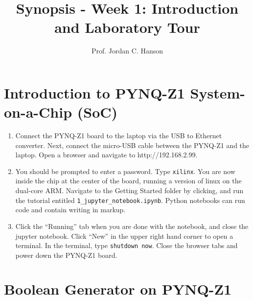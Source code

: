 \documentclass{article}
\begin{document}
\title{Synopsis - Week 1: Introduction and Laboratory Tour}
\author{Prof. Jordan C. Hanson}

\maketitle

\section{Introduction to PYNQ-Z1 System-on-a-Chip (SoC)}

\begin{enumerate}
\item Connect the PYNQ-Z1 board to the laptop via the USB to Ethernet converter.  Next, connect the micro-USB cable between the PYNQ-Z1 and the laptop.  Open a browser and navigate to http://192.168.2.99.
\item You should be prompted to enter a password.  Type \verb+xilinx+.  You are now inside the chip at the center of the board, running a version of linux on the dual-core ARM.  Navigate to the Getting Started folder by clicking, and run the tutorial entitled \verb+1_jupyter_notebook.ipynb+.  Python notebooks can run code and contain writing in markup.
\item Click the ``Running'' tab when you are done with the notebook, and close the jupyter notebook.  Click ``New'' in the upper right hand corner to open a terminal.  In the terminal, type \verb+shutdown now+.  Close the browser tabs and power down the PYNQ-Z1 board.
\end{enumerate}

\section{Boolean Generator on PYNQ-Z1}
\end{document}
